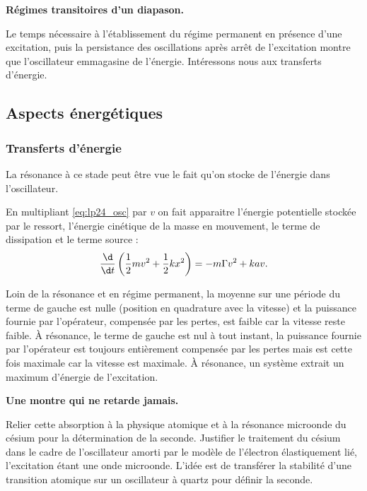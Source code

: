 \begin{experience}
\textbf{Régimes transitoires d'un diapason.}
\end{experience}

\begin{transition}
Le temps nécessaire à l'établissement du régime permanent en présence d'une excitation, puis la persistance des oscillations après arrêt de l'excitation montre que l'oscillateur emmagasine de l'énergie.
Intéressons nous aux transferts d'énergie.
\end{transition}

\subsection{Aspects énergétiques}

\subsubsection{Transferts d'énergie}

\begin{remarque}
La résonance à ce stade peut être vue le fait qu'on stocke de l'énergie dans l'oscillateur.
\end{remarque}

En multipliant \eqref{eq:lp24_osc} par $v$ on fait apparaitre l'énergie potentielle stockée par le ressort, l'énergie cinétique de la masse en mouvement, le terme de dissipation et le terme source : 
\begin{equation}
\frac{\d}{\d t} \left( \frac{1}{2}mv^2 + \frac{1}{2}kx^2 \right) = -m\Gamma v^2 + kav.
\end{equation}

Loin de la résonance et en régime permanent, la moyenne sur une période du terme de gauche est nulle (position en quadrature avec la vitesse) et la puissance fournie par l'opérateur, compensée par les pertes, est faible car la vitesse reste faible.
À résonance, le terme de gauche est nul à tout instant, la puissance fournie par l'opérateur est toujours entièrement compensée par les pertes mais est cette fois maximale car la vitesse est maximale.
À résonance, un système extrait un maximum d'énergie de l'excitation.

\begin{slide}
\textbf{Une montre qui ne retarde jamais.}
\end{slide}

Relier cette absorption à la physique atomique et à la résonance microonde du césium pour la détermination de la seconde.
Justifier le traitement du césium dans le cadre de l'oscillateur amorti par le modèle de l'électron élastiquement lié, l'excitation étant une onde microonde.
L'idée est de transférer la stabilité d'une transition atomique sur un oscillateur à quartz pour définir la seconde.


